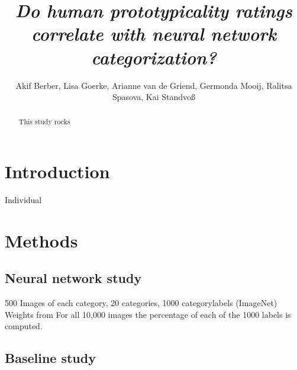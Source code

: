 \documentclass[10pt,a4paper,twocolumn]{article}
\begin{document}
\title{\textit{Do human prototypicality ratings correlate with neural network categorization?}}
\author{Akif Berber, Lisa Goerke, Arianne van de Griend, Germonda Mooij, Ralitsa Spasova, Kai Standvoß}


\maketitle
\thispagestyle{fancy}

\begin{abstract}

This study rocks

\end{abstract}

\section*{Introduction}
Individual

\section*{Methods}
\subsection*{Neural network study}
500 Images of each category, 20 categories, 1000 categorylabels (ImageNet)
Weights from \cite{simonyan2014very}
For all 10,000 images the percentage of each of the 1000 labels is computed.
\subsection*{Baseline study}
\end{document}
